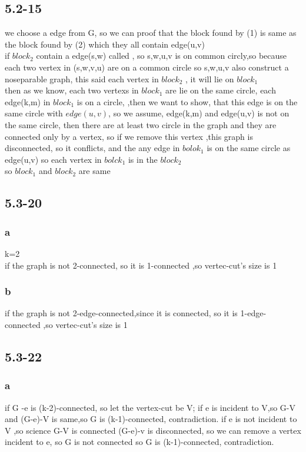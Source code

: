 \documentclass[a4paper,UTF8]{article}
\theoremstyle{definition}
\begin{document}
\subsection*{5.2-15}
we choose a  edge from G, so we can proof that the block found by (1) is same as the block found by (2) which they all contain edge(u,v)\\
if $block_2$ contain a edge(s,w)  called , so s,w,u,v is on common circly,so because each two vertex in (s,w,v,u) are on a common circle
so s,w,u,v  also construct a noseparable graph, this said each vertex in $block_2$ , it will lie on $block_1$\\
then as we know, each two vertexs in $block_1$ are lie on the same circle, each edge(k,m) in $block_1$ is on a circle,
,then we want to show, that this edge is on the same circle with $edge(u,v)$, so we assume, edge(k,m) and edge(u,v) is not on the same circle, then there are at least two circle in the graph and they are connected only by
a vertex, so if we remove this vertex ,this graph is disconnected, so it conflicts, and the any edge in $bolok_1$ is on the same circle as edge(u,v)
so each vertex in $bolck_1$ is in the $block_2$\\
so $block_1$ and $block_2$ are same

\subsection*{5.3-20}
\subsubsection*{a}
k=2\\
if the graph is not 2-connected, so it is 1-connected ,so vertec-cut's size is 1\\
\subsubsection*{b}

if the graph is not 2-edge-connected,since it is connected, so it is 1-edge-connected ,so vertec-cut's size is 1\\
\subsection*{5.3-22}
\subsubsection*{a}
if G -e is (k-2)-connected, so let the vertex-cut be V;
if e is incident to V,so G-V and (G-e)-V is same,so G is (k-1)-connected, contradiction.
if e is not incident to V ,so science G-V is connected (G-e)-v is disconnected,  so we can remove a vertex incident to e, so G is not connected
so G is (k-1)-connected, contradiction.
\end{document}
